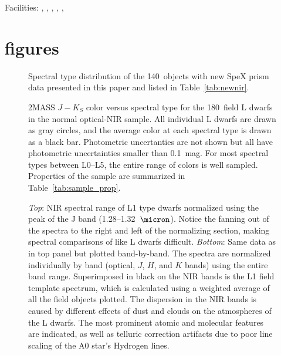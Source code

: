 \documentclass[12pt,preprint]{aastex}
\newcommand{\sample}{180}
\newcommand{\prismspectra}{140} %
\begin{document}
Facilities: 
, 
,
, 
,
, 
                                     

%


\clearpage 
\section{figures}

\begin{figure}
		\caption{Spectral type distribution of the \prismspectra~objects with new SpeX prism data presented in this paper and listed in Table~\ref{tab:newnir}.}
	\label{fig:newdata_spthist}
\end{figure}

\begin{figure}
		\caption{2MASS $J-K_S$ color versus spectral type for the \sample~field L dwarfs in the normal optical-NIR sample. All individual L dwarfs are drawn as gray circles, and the average color at each spectral type is drawn as a black bar. Photometric uncertanties are not shown but all have photometric uncertainties smaller than 0.1~mag. For most spectral types between L0--L5, the entire range of colors is well sampled. Properties of the sample are summarized in Table~\ref{tab:sample_prop}.}
	\label{fig:JK_colors}
\end{figure}


\begin{figure}
	\caption{\emph{Top}: NIR spectral range of L1 type dwarfs normalized using the peak of the J band (1.28--1.32~$\micron$). Notice the fanning out of the spectra to the right and left of the normalizing section, making spectral comparisons of like L dwarfs difficult. \emph{Bottom}: Same data as in top panel but plotted band-by-band. The spectra are normalized individually by band (optical, $J$, $H$, and $K$ bands) using the entire band range. Superimposed in black on the NIR bands is the L1 field template spectrum, which is calculated using a weighted average of all the field objects plotted. The dispersion in the NIR bands is caused by different effects of dust and clouds on the atmospheres of the L dwarfs. The most prominent atomic and molecular features are indicated, as well as telluric correction artifacts due to poor line scaling of the A0 star's Hydrogen lines.}
	\label{fig:L1fan}
\end{figure}
\end{document}
